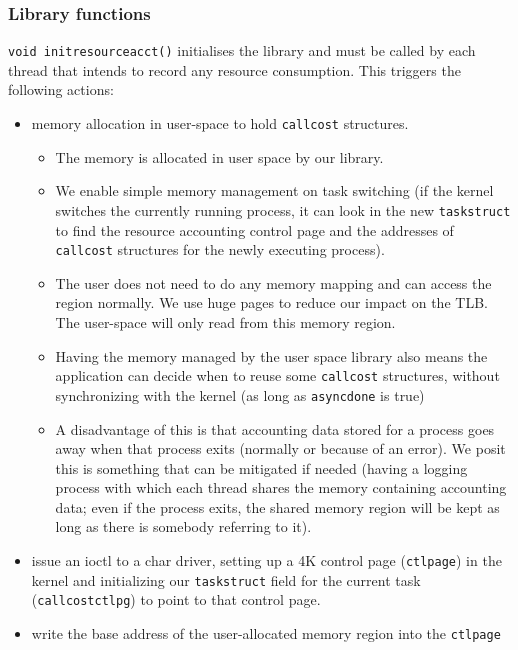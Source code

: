 \documentclass[12pt]{article}
\def\_{\textunderscore\-}
\begin{document}
\subsubsection{Library functions}
{\color{blue}\texttt{void init\_resource\_acct()}} initialises the library and must be called by each thread that intends to record any resource consumption. This triggers the following actions:
\begin{itemize}
\item memory allocation in user-space to hold \texttt{call\_cost} structures.
	\begin{itemize}
	\item The memory is allocated in user space by our library.
	\item We enable simple memory management on task switching (if the kernel switches the currently running process, it can look in the new \texttt{task\_struct} to find the resource accounting control page and the addresses of \texttt{call\_cost} structures for the newly executing process).
	\item The user does not need to do any memory mapping and can access the region normally. We use huge pages to reduce our impact on the TLB. The user-space will only read from this memory region.
	\item Having the memory managed by the user space library also means the application can decide when to reuse some \texttt{call\_cost} structures, without synchronizing with the kernel (as long as \texttt{async\_done} is true)
	\item A disadvantage of this is that accounting data stored for a process goes away when that process exits (normally or because of an error). We posit this is something that can be mitigated if needed (having a logging process with which each thread shares the memory containing accounting data; even if the process exits, the shared memory region will be kept as long as there is somebody referring to it). 
	\end{itemize} 
\item issue an ioctl to a char driver, setting up a 4K control page (\texttt{ctl\_page}) in the kernel and initializing our \texttt{task\_struct} field for the current task (\texttt{call\_cost\_ctlpg}) to point to that control page.
\item write the base address of the user-allocated memory region into the \texttt{ctl\_page}
\end{itemize}
\end{document}
